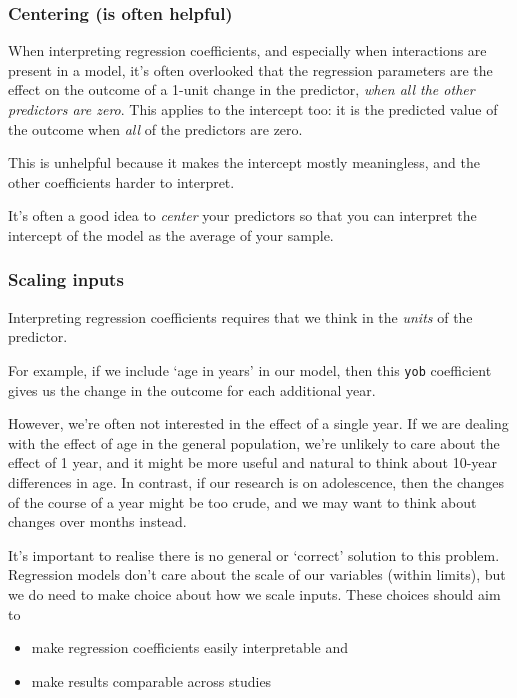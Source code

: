 \documentclass[]{article}
\providecommand{\tightlist}{%
  \setlength{\itemsep}{0pt}\setlength{\parskip}{0pt}}
\theoremstyle{definition}
\theoremstyle{definition}
\theoremstyle{definition}
\theoremstyle{remark}
\begin{document}
\subsubsection*{Centering (is often helpful)}\label{centering}

When interpreting regression coefficients, and especially when
interactions are present in a model, it's often overlooked that the
regression parameters are the effect on the outcome of a 1-unit change
in the predictor, \emph{when all the other predictors are zero}. This
applies to the intercept too: it is the predicted value of the outcome
when \emph{all} of the predictors are zero.

This is unhelpful because it makes the intercept mostly meaningless, and
the other coefficients harder to interpret.

It's often a good idea to \emph{center} your predictors so that you can
interpret the intercept of the model as the average of your sample.

\subsubsection*{Scaling inputs}\label{scaling-regression-inputs}

Interpreting regression coefficients requires that we think in the
\emph{units} of the predictor.

For example, if we include `age in years' in our model, then this
\texttt{yob} coefficient gives us the change in the outcome for each
additional year.

However, we're often not interested in the effect of a single year. If
we are dealing with the effect of age in the general population, we're
unlikely to care about the effect of 1 year, and it might be more useful
and natural to think about 10-year differences in age. In contrast, if
our research is on adolescence, then the changes of the course of a year
might be too crude, and we may want to think about changes over months
instead.

It's important to realise there is no general or `correct' solution to
this problem. Regression models don't care about the scale of our
variables (within limits), but we do need to make choice about how we
scale inputs. These choices should aim to

\begin{itemize}
\tightlist
\item
  make regression coefficients easily interpretable and
\item
  make results comparable across studies
\end{itemize}
\end{document}
